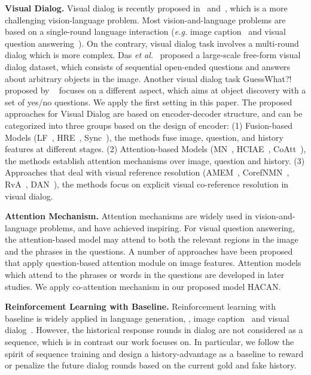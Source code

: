 \documentclass[10pt,twocolumn,letterpaper]{article}
\begin{document}
\noindent\textbf{Visual Dialog.} Visual dialog is recently proposed in~\cite{das2017visual} and~\cite{de2017guesswhat}, which is a more challenging vision-language problem. Most vision-and-language problems are based on a single-round language interaction (\emph{e.g.} image caption~\cite{donahue2015long,fang2015captions,karpathy2015deep,anderson2017bottom} and visual question answering~\cite{anderson2017bottom,agrawal2016sort,antol2015vqa,das2017human,lu2016hierarchical}). On the contrary, visual dialog task involves a multi-round dialog which is more complex. Das \textit{et al.}~\cite{das2017visual} proposed a large-scale free-form visual dialog dataset, which consists of sequential open-ended questions and answers about arbitrary objects in the image. Another visual dialog task GuessWhat?! proposed by ~\cite{de2017guesswhat} focuses on a different aspect, which aims at object discovery with a set of yes/no questions. We apply the first setting in this paper. The proposed approaches for Visual Dialog are based on encoder-decoder structure, and can be categorized into three groups based on the design of encoder: (1) Fusion-based Models (LF~\cite{das2017visual}, HRE~\cite{das2017visual}, Sync~\cite{guo2019image}), the methods fuse image, question, and history features at different stages. (2) Attention-based Models (MN~\cite{das2017visual}, HCIAE~\cite{lu2017best}, CoAtt~\cite{lu2016hierarchical}), the methods
establish attention mechanisms over image, question and history. (3) Approaches that deal with visual reference resolution (AMEM~\cite{seo2017visual}, CorefNMN~\cite{kottur2018visual}, RvA~\cite{kang2019dual}, DAN~\cite{kang2019dual}), the methods focus on explicit visual co-reference resolution in visual dialog.

\noindent\textbf{Attention Mechanism.} Attention mechanisms are widely used in vision-and-language problems, and have achieved inspiring. For visual question answering, the attention-based model may attend to both the relevant regions in the image and the phrases in the questions. A number of approaches\cite{yang2016stacked, zhu2017structured, das2017human, fukui2016multimodal, shih2016look} have been proposed that apply question-based attention module on image features. Attention models~\cite{lu2016hierarchical, nam2016dual} which attend to the phrases or words in the questions are developed in later studies. We apply co-attention mechanism in our proposed model HACAN.

\noindent\textbf{Reinforcement Learning with Baseline.} Reinforcement learning with baseline is widely applied in language generation, \eg, image caption~\cite{rennie2017self} and visual dialog~\cite{lu2017best, wu2017you}. However, the historical response rounds in dialog are not considered as a sequence, which is in contrast our work focuses on. In particular, we follow the spirit of sequence training and design a history-advantage as a baseline to reward or penalize the future dialog rounds based on the current gold and fake history.
\end{document}
